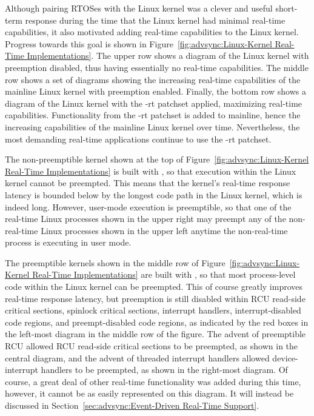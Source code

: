 Although pairing RTOSes with the Linux kernel was a clever and useful
short-term response during the time that the Linux kernel had minimal
real-time capabilities, it also motivated adding real-time capabilities
to the Linux kernel.
Progress towards this goal is shown in
Figure~\ref{fig:advsync:Linux-Kernel Real-Time Implementations}.
The upper row shows a diagram of the Linux kernel with preemption disabled,
thus having essentially no real-time capabilities.
The middle row shows a set of diagrams showing the increasing real-time
capabilities of the mainline Linux kernel with preemption enabled.
Finally, the bottom row shows a diagram of the Linux kernel with the
-rt patchset applied, maximizing real-time capabilities.
Functionality from the -rt patchset is added to mainline,
hence the increasing capabilities of the mainline Linux kernel over time.
Nevertheless, the most demanding real-time applications continue to use
the -rt patchset.

The non-preemptible kernel shown at the top of
Figure~\ref{fig:advsync:Linux-Kernel Real-Time Implementations}
is built with , so that execution within the Linux
kernel cannot be preempted.
This means that the kernel's real-time response latency is bounded below
by the longest code path in the Linux kernel, which is indeed long.
However, user-mode execution is preemptible, so that one of the
real-time Linux processes shown in the upper right may preempt any of the
non-real-time Linux processes shown in the upper left anytime the
non-real-time process is executing in user mode.

The preemptible kernels shown in the middle row of
Figure~\ref{fig:advsync:Linux-Kernel Real-Time Implementations}
are built with , so that most process-level code
within the Linux kernel can be preempted.
This of course greatly improves real-time response latency, but
preemption is still disabled
within RCU read-side critical sections,
spinlock critical sections,
interrupt handlers,
interrupt-disabled code regions, and
preempt-disabled code regions, as indicated by the red boxes in the
left-most diagram in the middle row of the figure.
The advent of preemptible RCU allowed RCU read-side critical sections
to be preempted, as shown in the central diagram,
and the advent of threaded interrupt handlers allowed device-interrupt
handlers to be preempted, as shown in the right-most diagram.
Of course, a great deal of other real-time functionality was added
during this time, however, it cannot be as easily represented on this
diagram.
It will instead be discussed in
Section~\ref{sec:advsync:Event-Driven Real-Time Support}.

